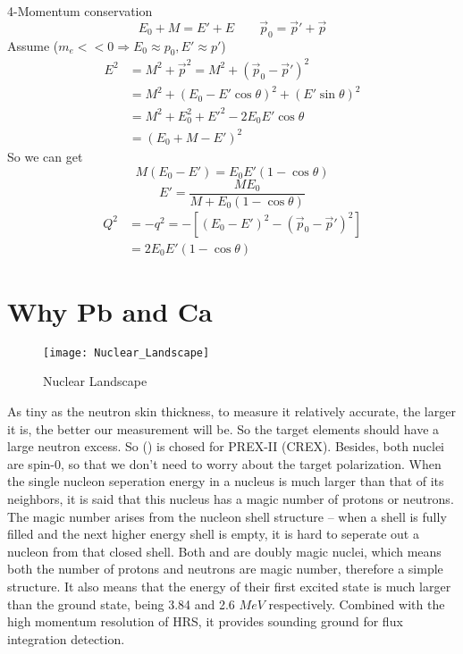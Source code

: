 4-Momentum conservation 
$$ E_0 + M = E' + E \qquad \vec{p}_0 = \vec{p}' + \vec{p} $$
Assume ($m_e << 0 \Rightarrow E_0 \approx p_0, E' \approx p'$)
\begin{equation*}
    \begin{aligned}
	E^2 &= M^2 + \vec{p}^2 = M^2 + (\vec{p}_0 - \vec{p}')^2  \\
	    &= M^2 + (E_0 - E'\cos\theta)^2 + (E'\sin\theta)^2	\\
	    &= M^2 + E_0^2 + E'^2 - 2E_0E'\cos\theta	\\
	    &= (E_0 + M - E')^2
    \end{aligned}
\end{equation*}
So we can get
$$ M(E_0 - E') = E_0E'(1-\cos\theta) $$
$$ E' = \frac{ME_0}{M + E_0(1-\cos\theta)}$$
\begin{equation*}
    \begin{aligned}
	Q^2 &= -q^2 = -[(E_0 - E')^2 - (\vec{p}_0 - \vec{p}')^2]    \\
	    &= 2E_0E'(1-\cos\theta)
    \end{aligned}
\end{equation*}

\section{Why Pb and Ca}
\begin{figure}
    \centering
    \texttt{[image: Nuclear\_Landscape]}
    \caption{Nuclear Landscape}
    \label{fig:nuclear_landscape}
\end{figure}
As tiny as the neutron skin thickness, to measure it relatively accurate, the
larger it is, the better our measurement will be. So the target elements should
have a large neutron excess. So \Pb (\Ca) is chosed for PREX-II (CREX). Besides,
both nuclei are spin-0, so that we don't need to worry about the target 
polarization.
When the single nucleon seperation energy in a nucleus is much larger than that of
its neighbors, it is said that this nucleus has a magic number of protons or
neutrons. The magic number arises from the nucleon shell structure -- when 
a shell is fully filled and the next higher energy shell is empty, it is hard
to seperate out a nucleon from that closed shell.
Both \Ca and \Pb are doubly magic nuclei, which means both the number of protons
and neutrons are magic number, therefore a simple structure. 
It also means that the energy of their first 
excited state is much larger than the ground state, being 3.84 and 2.6 $MeV$ 
respectively. Combined with the high momentum resolution of HRS, it provides
sounding ground for flux integration detection.

